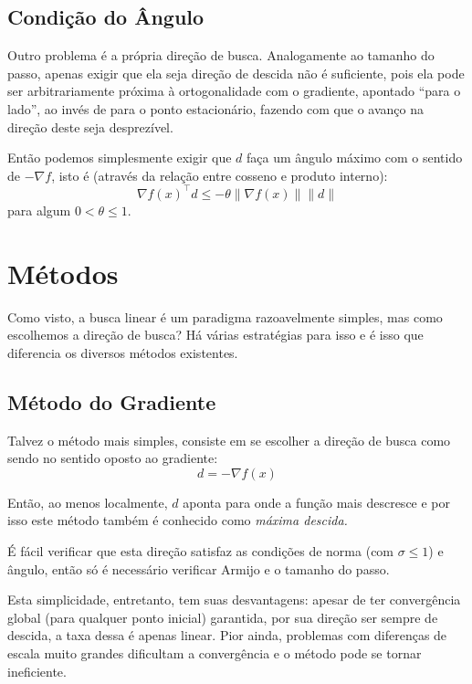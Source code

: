 \documentclass[a4paper,11pt]{article}
\begin{document}
        \subsection*{Condição do Ângulo}
            Outro problema é a própria direção de busca. Analogamente ao tamanho do passo, apenas exigir que ela seja direção de descida não
            é suficiente, pois ela pode ser arbitrariamente próxima à ortogonalidade com o gradiente, apontado ``para o lado'', ao invés de
            para o ponto estacionário, fazendo com que o avanço na direção deste seja desprezível.

            Então podemos simplesmente exigir que $d$ faça um ângulo máximo com o sentido de $-\nabla f$, isto é (através da relação entre cosseno
            e produto interno):
                $$ \nabla f(x)^\top d \leq -\theta \|\nabla f(x)\| \|d\| $$
            para algum $0 < \theta \leq 1$.

    \section*{Métodos}
        Como visto, a busca linear é um paradigma razoavelmente simples, mas como escolhemos a direção de busca? Há várias estratégias para isso e é
        isso que diferencia os diversos métodos existentes.

        \subsection*{Método do Gradiente}
            Talvez o método mais simples, consiste em se escolher a direção de busca como sendo no sentido oposto ao gradiente:
                $$ d = -\nabla f(x) $$

            Então, ao menos localmente, $d$ aponta para onde a função mais descresce e por isso este método também é conhecido como \emph{máxima descida.}

            É fácil verificar que esta direção satisfaz as condições de norma (com $\sigma \leq 1$) e ângulo, então só é necessário verificar Armijo e o tamanho do passo.

            Esta simplicidade, entretanto, tem suas desvantagens: apesar de ter convergência global (para qualquer ponto inicial) garantida,
            por sua direção ser sempre de descida, a taxa dessa é apenas linear. Pior ainda, problemas com diferenças de escala muito grandes dificultam a convergência
            e o método pode se tornar ineficiente.
\end{document}
